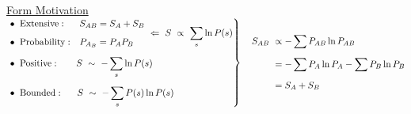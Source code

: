 \documentclass[12pt]{article}
\begin{document}
\vspace{20pt}\noindent
\underline{Form Motivation}\\[10pt]
\(\left. \begin{aligned}
    &\begin{aligned}
        &\bullet \ \text{Extensive}:&   &S_{AB} = S_A + S_B\\[5pt]
        &\bullet \ \text{Probability}:& &P_{A_B} = P_A P_B
    \end{aligned} \ \Leftarrow \ S \ \propto\ \sum_s \ln{P(s)}\\[5pt]
    &\bullet \ \text{Positive}: \indent \ S \ \sim\ - \sum_s \ln{P(s)}\\[5pt]
    &\bullet \ \text{Bounded}: \indent S \ \sim\ - \sum_s P(s) \ln{P(s)}
\end{aligned} \right\} \ \ \ 
\begin{aligned}
    S_{AB} \ &\propto - \sum P_{AB} \ln{P_{AB}} \\[5pt]
    &= - \sum P_{A} \ln{P_{A}} - \sum P_{B} \ln{P_{B}}\\[5pt]
    &= S_A + S_B
\end{aligned}\)


\newpage
\end{document}
